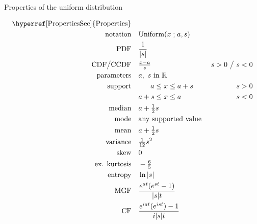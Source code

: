 

\begin{table*}[t!]
\caption[Uniform distribution -- Properties]{Properties of the uniform distribution}
\begin{align*}
\text{\hyperref[PropertiesSec]{Properties}}  \quad& \\
\text{notation} \quad & \text{Uniform}(x \given a,s) 				\checked
\\
\text{PDF} \quad & \frac{1}{|s|}								\checked
\\
\text{CDF} \big/ \text{CCDF} \quad  &  \tfrac{x-a}{s} & s>0 \ \big/ \   s<0 
\\
\text{parameters} \quad & a,\ s \text{ in }  \mathbb{R}			\checked
\\
\text{support} \quad &  \phantom{s+{}} a \leq x \leq a+s      & s>0					\checked
\\
				&    a+s \leq x \leq a    & s<0					\checked
\\
\text{median} \quad  & a + \half s							\checked
\\
\text{mode} \quad  & \text{any supported value }				\checked
\\
\text{mean} \quad  & a + \half s								\checked
\\
\text{variance} \quad  & \sfrac{1}{12}s^2						\checked
\\
\text{skew} \quad  & 0									\checked
\\
\text{ex. kurtosis} \quad  & -\tfrac{6}{5}							\checked
\\
\text{entropy} \quad  & \ln |s|  								\checked
\\
\text{MGF} \quad  &  \frac{e^{at}( e^{st}- 1 ) }{ |s| t}		\checked
\\
\text{CF} \quad  & \frac{e^{iat} (e^{i st})-1 }{ i |s| t}		\checked
\end{align*}

\end{table*}
